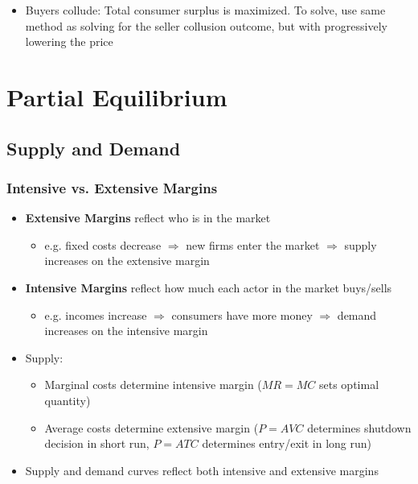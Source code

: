 \documentclass{article}
\newcommand{\blue}[1]{{\color{blue}#1}}
\begin{document}
\begin{itemize}
\begin{itemize}
			\item Buyers collude: Total consumer surplus is maximized. To solve, use same method as solving for the seller collusion outcome, but with progressively lowering the price
		\end{itemize}
\end{itemize}

\pagebreak
\section{Partial Equilibrium}



\subsection{Supply and Demand}
\subsubsection{Intensive vs. Extensive Margins}
\begin{itemize}
	\item \textbf{Extensive Margins} reflect who is in the market
		\begin{itemize}
			\item e.g. fixed costs decrease $\Rightarrow$ new firms enter the market $\Rightarrow$ supply increases on the extensive margin
		\end{itemize}
	\item \textbf{Intensive Margins} reflect how much each actor in the market buys/sells
		\begin{itemize}
			\item e.g. incomes increase $\Rightarrow$ consumers have more money $\Rightarrow$ demand increases on the intensive margin
		\end{itemize}
	\item Supply:
		\begin{itemize}
			\item Marginal costs determine intensive margin ($MR = MC$ sets optimal quantity)
			\item Average costs determine extensive margin ($P=AVC$ determines shutdown decision in short run, $P=ATC$ determines entry/exit in long run)
		\end{itemize}
	\item Supply and demand curves reflect \blue{both} intensive and extensive margins
\end{itemize}
\end{document}
